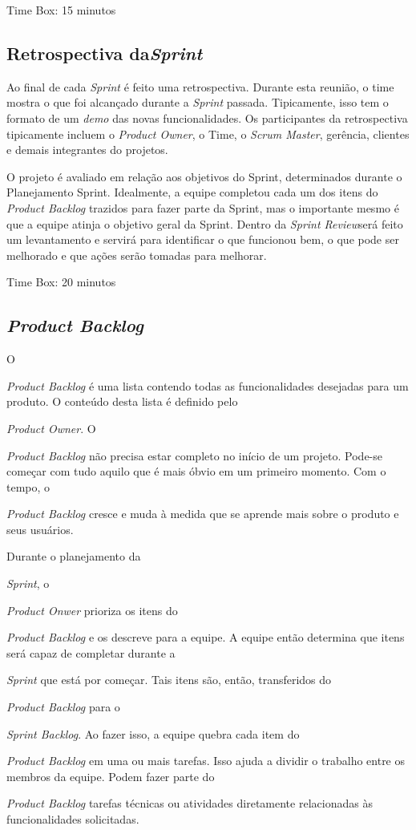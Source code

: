 {{{{{{{{{{{Time Box: 15 minutos

\subsection{Retrospectiva da\emph{Sprint}}

Ao final de cada \emph{Sprint} é feito uma retrospectiva. Durante esta reunião, o time mostra o que foi alcançado durante a \emph{Sprint} passada. 
Tipicamente, isso tem o formato de um \emph{demo} das novas funcionalidades. Os participantes da retrospectiva tipicamente incluem o \emph{Product Owner}, 
o Time, o \emph{Scrum Master}, gerência, clientes e demais integrantes do projetos.

O projeto é avaliado em relação aos objetivos do Sprint, determinados durante o Planejamento Sprint. Idealmente, a equipe completou cada um dos itens do 
\emph{Product Backlog} trazidos para fazer parte da Sprint, mas o importante mesmo é que a equipe atinja o objetivo geral da Sprint.
Dentro da \emph{Sprint Review}será feito um levantamento e servirá para identificar o que funcionou bem, o que pode ser melhorado e que ações serão tomadas para melhorar.

Time Box: 20 minutos    

\subsection{\emph{Product Backlog}}

O {\emph{Product Backlog} é uma lista contendo todas as funcionalidades desejadas para um produto. O conteúdo desta lista é definido pelo {\emph{Product Owner}. 
O {\emph{Product Backlog} não precisa estar completo no início de um projeto. Pode-se começar com tudo aquilo que é mais óbvio em um primeiro momento. 
Com o tempo, o {\emph{Product Backlog} cresce e muda à medida que se aprende mais sobre o produto e seus usuários.

Durante o planejamento da {\emph{Sprint}, o {\emph{Product Onwer} prioriza os itens do {\emph{Product Backlog} e os descreve para a equipe. A equipe então determina que itens será 
capaz de completar durante a {\emph{Sprint} que está por começar. Tais itens são, então, transferidos do {\emph{Product Backlog} para o {\emph{Sprint Backlog}. 
Ao fazer isso, a equipe quebra cada item do {\emph{Product Backlog} em uma ou mais tarefas. Isso ajuda a dividir o trabalho entre os membros 
da equipe. Podem fazer parte do {\emph{Product Backlog} tarefas técnicas ou atividades diretamente relacionadas às funcionalidades solicitadas.


}}}}}}}}}}}}}}}}}}}}}}}
